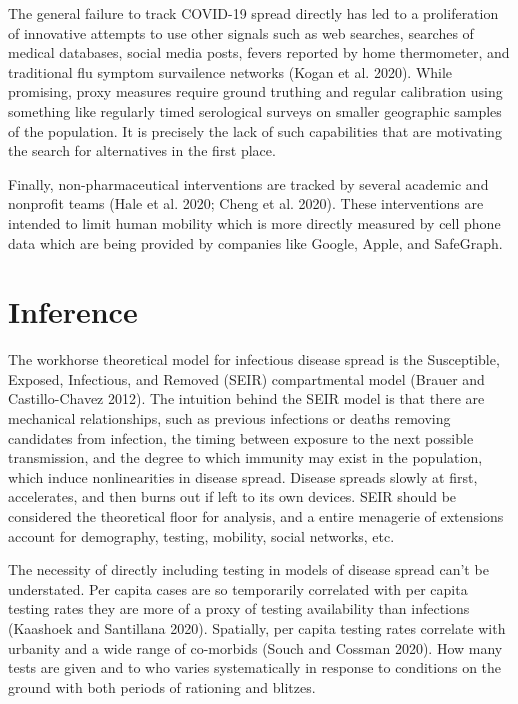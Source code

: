 \documentclass[10pt,letterpaper]{article}
\begin{document}
The general failure to track COVID-19 spread directly has led to a
proliferation of innovative attempts to use other signals such as web
searches, searches of medical databases, social media posts, fevers
reported by home thermometer, and traditional flu symptom survailence
networks (Kogan et al. 2020). While promising, proxy measures require
ground truthing and regular calibration using something like regularly
timed serological surveys on smaller geographic samples of the
population. It is precisely the lack of such capabilities that are
motivating the search for alternatives in the first place.

Finally, non-pharmaceutical interventions are tracked by several
academic and nonprofit teams (Hale et al. 2020; Cheng et al. 2020).
These interventions are intended to limit human mobility which is more
directly measured by cell phone data which are being provided by
companies like Google, Apple, and SafeGraph.

\hypertarget{inference}{%
\section{Inference}\label{inference}}

The workhorse theoretical model for infectious disease spread is the
Susceptible, Exposed, Infectious, and Removed (SEIR) compartmental model
(Brauer and Castillo-Chavez 2012). The intuition behind the SEIR model
is that there are mechanical relationships, such as previous infections
or deaths removing candidates from infection, the timing between
exposure to the next possible transmission, and the degree to which
immunity may exist in the population, which induce nonlinearities in
disease spread. Disease spreads slowly at first, accelerates, and then
burns out if left to its own devices. SEIR should be considered the
theoretical floor for analysis, and a entire menagerie of extensions
account for demography, testing, mobility, social networks, etc.

The necessity of directly including testing in models of disease spread
can't be understated. Per capita cases are so temporarily correlated
with per capita testing rates they are more of a proxy of testing
availability than infections (Kaashoek and Santillana 2020). Spatially,
per capita testing rates correlate with urbanity and a wide range of
co-morbids (Souch and Cossman 2020). How many tests are given and to who
varies systematically in response to conditions on the ground with both
periods of rationing and blitzes.
\end{document}
